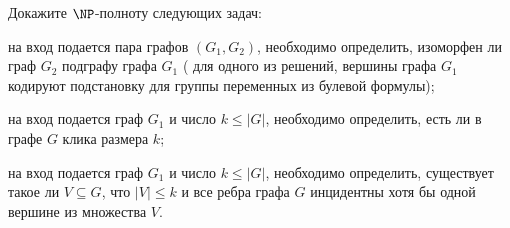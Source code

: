 Докажите $\NP$-полноту следующих задач:
\begin{enumcyr}
    \item на вход подается пара графов $(G_1, G_2)$, необходимо определить, изоморфен ли граф $G_2$
        подграфу графа $G_1$ ( для одного из решений, вершины графа $G_1$ кодируют
        подстановку для группы переменных из булевой формулы);
    \item на вход подается граф $G_1$ и число $k \le |G|$, необходимо определить, есть ли в графе $G$
        клика размера $k$;
    \item на вход подается граф $G_1$ и число $k \le |G|$, необходимо определить, существует такое ли $V
        \subseteq G$, что $|V| \le k$ и все ребра графа $G$ инцидентны хотя бы одной вершине из множества
        $V$.
\end{enumcyr}